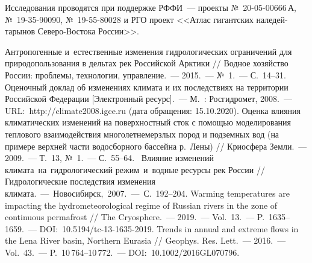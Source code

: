 Исследования проводятся при поддержке РФФИ~--- проекты №~20-05-00666\,А, №~19-35-90090, №~19-55-80028 и РГО проект <<Атлас гигантских наледей-тарынов Северо-Востока России>>.

\begin{thebibliography}{99}
\bibitem{} Антропогенные и~естественные изменения гидрологических ограничений для природопользования в дельтах рек Российской Арктики // Водное хозяйство России: проблемы, технологии, управление.~--- 2015.~--- №~1.~--- С.~14--31.
\bibitem{}Оценочный доклад об изменениях климата и их последствиях на территории Российской Федерации [Электронный ресурс].~--- М.~: Росгидромет, 2008.~--- URL:~http://climate2008.igce.ru (дата обращения: 15.10.2020).
\bibitem{} Оценка влияния климатических изменений на поверхностный сток с помощью моделирования теплового взаимодействия многолетнемерзлых пород и подземных вод (на примере верхней части водосборного бассейна р.~Лены) // Криосфера Земли.~--- 2009.~--- Т.~13, №~1.~--- С.~55--64.
\bibitem{} Влияние изменений климата на гидрологический режим и водные ресурсы рек России // Гидрологические последствия изменения климата.~--- Новосибирск, 2007.~--- С.~192--204.
\bibitem{} Warming temperatures are impacting the hydrometeorological regime of Russian rivers in the zone of continuous permafrost // The Cryosphere.~--- 2019.~--- Vol.~13.~--- P.~1635--1659.~--- DOI:~10.5194/tc-13-1635-2019.
\bibitem{} Trends in annual and extreme flows in the Lena River basin, Northern Eurasia // Geophys. Res. Lett.~--- 2016.~--- Vol.~43.~--- P.~10\,764--10\,772.~--- DOI:~10.1002/2016GL070796.

\end{thebibliography}

